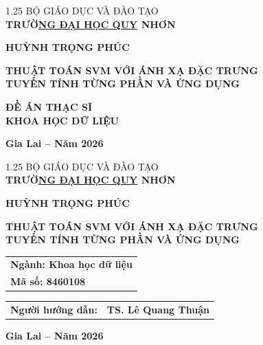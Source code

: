 \begin{titlepage}
\centering
\begin{spacing}{1.25}
{\large BỘ GIÁO DỤC VÀ ĐÀO TẠO}\\
{\large\bfseries TRƯỜ\underline{NG ĐẠI HỌC QUY} NHƠN}

\vspace*{2.2cm}
{\large\bfseries HUỲNH TRỌNG PHÚC}

\vspace*{2.4cm}
{\fontsize{19}{26}\selectfont\bfseries THUẬT TOÁN SVM VỚI ÁNH XẠ ĐẶC TRƯNG\\[2pt]
TUYẾN TÍNH TỪNG PHẦN VÀ ỨNG DỤNG\par}

\vspace*{2.2cm}
{\large\bfseries ĐỀ ÁN THẠC SĨ\\ KHOA HỌC DỮ LIỆU}

\vfill
{\bfseries Gia Lai -- Năm 2026}
\end{spacing}
\end{titlepage}

\begin{titlepage}
\centering
\begin{spacing}{1.25}
{\large BỘ GIÁO DỤC VÀ ĐÀO TẠO}\\
{\large\bfseries TRƯỜ\underline{NG ĐẠI HỌC QUY} NHƠN}

\vspace*{2.2cm}
{\large\bfseries HUỲNH TRỌNG PHÚC}

\vspace*{2.4cm}
{\fontsize{19}{26}\selectfont\bfseries THUẬT TOÁN SVM VỚI ÁNH XẠ ĐẶC TRƯNG\\[2pt]
TUYẾN TÍNH TỪNG PHẦN VÀ ỨNG DỤNG\par}

\vspace*{2.2cm}
\begin{tabular}{l}
\textbf{Ngành: Khoa học dữ liệu}\\
\textbf{Mã số: 8460108}
\end{tabular}

\vspace*{1.8cm}
\begin{tabular}{ll}
\textbf{Người hướng dẫn:} & \textbf{TS. Lê Quang Thuận}
\end{tabular}

\vfill
{\bfseries Gia Lai -- Năm 2026}
\end{spacing}
\end{titlepage}

